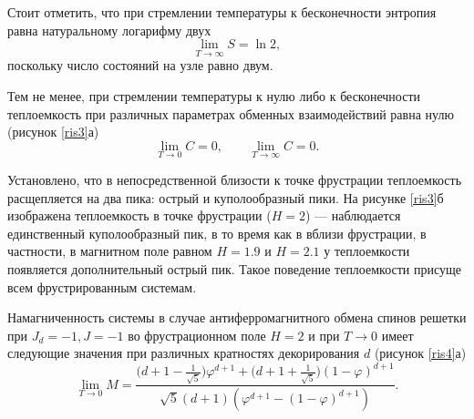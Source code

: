 Стоит отметить, что при стремлении температуры к бесконечности энтропия равна натуральному логарифму двух 
\begin{equation}
\lim_{T\rightarrow \infty} S = \ln 2,
\label{23d}
\end{equation}
поскольку число состояний на узле равно двум.

Тем не менее, при стремлении температуры к нулю либо к бесконечности теплоемкость при различных параметрах обменных взаимодействий равна нулю (рисунок \ref{ris3}а)
\begin{equation}
\lim_{T\rightarrow 0} C = 0,\;\;\;\;\;\;\;\lim_{T\rightarrow \infty} C = 0.
\label{24d}
\end{equation}

Установлено, что в непосредственной близости к точке фрустрации теплоемкость расщепляется на два пика: острый и куполообразный пики. На рисунке \ref{ris3}б изображена теплоемкость в точке фрустрации ($H=2$) --- наблюдается единственный куполообразный пик, в то время как в вблизи фрустрации, в частности, в магнитном поле равном $H=1.9$ и $H=2.1$ у теплоемкости появляется дополнительный острый пик. Такое поведение теплоемкости присуще всем фрустрированным системам.


Намагниченность системы в случае антиферромагнитного обмена спинов решетки при $J_d=-1, J=-1$ во фрустрационном поле $H=2$ и при $T\rightarrow 0$ имеет следующие значения при различных кратностях декорирования $d$ (рисунок \ref{ris4}а)
\begin{equation}
\lim_{T \rightarrow 0} M = \frac{\Big(d+1-\frac{1}{\sqrt{5}}\Big)\varphi^{d+1}+\Big(d+1+\frac{1}{\sqrt{5}}\Big)(1-\varphi)^{d+1}}{\sqrt{5}(d+1)(\varphi^{d+1}-(1-\varphi)^{d+1})}.
\label{25d}
\end{equation}

